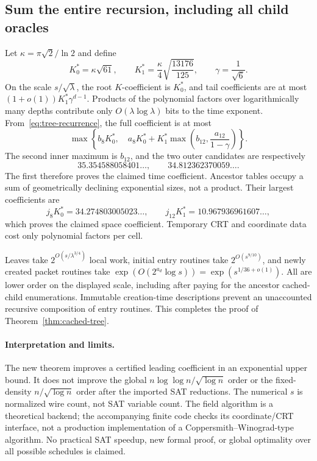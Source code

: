 \subsection{Sum the entire recursion, including all child oracles}
Let $\kappa=\pi\sqrt2/\ln2$ and define
\[
 K_0^*=\kappa\sqrt{61},\qquad
 K_1^*=\frac\kappa4\sqrt{\frac{13176}{125}},\qquad
 \gamma=\frac1{\sqrt6}.
\]
On the scale $s/\sqrt\lambda$, the root $K$-coefficient is $K_0^*$, and tail coefficients are at most $(1+o(1))K_1^*\gamma^{d-1}$. Products of the polynomial factors over logarithmically many depths contribute only $O(\lambda\log\lambda)$ bits to the time exponent. From~\eqref{eq:tree-recurrence}, the full coefficient is at most
\begin{equation}\label{eq:tree-total-time}
 \max\left\{b_8K_0^*,\quad
 a_8K_0^*+K_1^*\max\left(b_{12},\frac{a_{12}}{1-\gamma}\right)\right\}.
\end{equation}
The second inner maximum is $b_{12}$, and the two outer candidates are respectively
\[
 35.354588058401\ldots,\qquad34.812362370059\ldots.
\]
The first therefore proves the claimed time coefficient. Ancestor tables occupy a sum of geometrically declining exponential sizes, not a product. Their largest coefficients are
\[
 j_8K_0^*=34.274803005023\ldots,
 \qquad j_{12}K_1^*=10.967936961607\ldots,
\]
which proves the claimed space coefficient. Temporary CRT and coordinate data cost only polynomial factors per cell.

Leaves take $2^{O(s/\lambda^{3/4})}$ local work, initial entry routines take $2^{O(s^{9/10})}$, and newly created packet routines take
$\exp(O(2^{a_d}\log s))=\exp(s^{1/36+o(1)})$. All are lower order on the displayed scale, including after paying for the ancestor cached-child enumerations. Immutable creation-time descriptions prevent an unaccounted recursive composition of entry routines. This completes the proof of Theorem~\ref{thm:cached-tree}.

\paragraph{Interpretation and limits.}
The new theorem improves a certified leading coefficient in an exponential upper bound. It does not improve the global $n\log\log n/\sqrt{\log n}$ order or the fixed-density $n/\sqrt{\log n}$ order after the imported SAT reductions. The numerical $s$ is normalized wire count, not SAT variable count. The field algorithm is a theoretical backend; the accompanying finite code checks its coordinate/CRT interface, not a production implementation of a Coppersmith--Winograd-type algorithm. No practical SAT speedup, new formal proof, or global optimality over all possible schedules is claimed.
